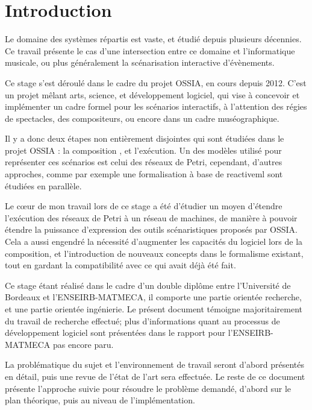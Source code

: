 \chapter*{Introduction}
Le domaine des systèmes répartis est vaste, et étudié depuis plusieurs décennies. Ce travail présente le cas d'une intersection entre ce domaine et l'informatique musicale, ou plus généralement la scénarisation interactive d'évènements. 

Ce stage s'est déroulé dans le cadre du projet  \ac{OSSIA}, en cours depuis 2012. C'est un projet mêlant arts, science, et développement logiciel, qui vise à concevoir et implémenter un cadre formel pour les scénarios interactifs, à l'attention des régies de spectacles, des compositeurs, ou encore dans un cadre muséographique. 

Il y a donc deux étapes non entièrement disjointes qui sont étudiées dans le projet \ac{OSSIA} : la composition , et l'exécution.
Un des modèles utilisé pour représenter ces scénarios est celui des réseaux de Petri, cependant, d'autres approches, comme par exemple une formalisation à base de \gls{reactiveml} sont étudiées en parallèle. 

Le cœur de mon travail lors de ce stage a été d'étudier un moyen d'étendre l'exécution des réseaux de Petri à un réseau de machines, de manière à pouvoir étendre la puissance d'expression des outils scénaristiques proposés par \ac{OSSIA}.
Cela a aussi engendré la nécessité d'augmenter les capacités du logiciel lors de la composition, et l'introduction de nouveaux concepts dans le formalisme existant, tout en gardant la compatibilité avec ce qui avait déjà été fait.

Ce stage étant réalisé dans le cadre d'un double diplôme entre l'Université de Bordeaux et l'ENSEIRB-MATMECA, il comporte une partie orientée recherche, et une partie orientée ingénierie. Le présent document témoigne majoritairement du travail de recherche effectué; plus d'informations quant au processus de développement logiciel sont présentées dans le rapport pour l'ENSEIRB-MATMECA pas encore paru.

La problématique du sujet et l'environnement de travail seront d'abord présentés en détail, puis une revue de l'état de l'art sera effectuée. Le reste de ce document présente l'approche suivie pour résoudre le problème demandé, d'abord sur le plan théorique, puis au niveau de l'implémentation.